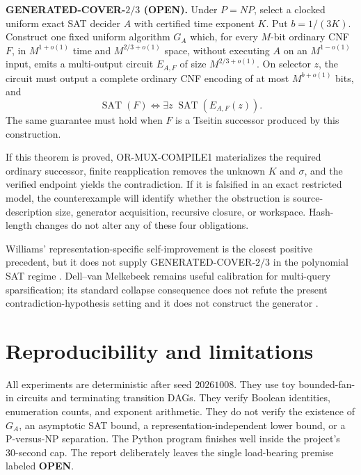 \documentclass[11pt]{article}
\newcommand{\SAT}{\operatorname{SAT}}
\newcommand{\OPEN}{\textcolor{openstatus}{\textbf{OPEN}}}
\begin{document}
\begin{openstatusbox}
\textbf{GENERATED-COVER-$2/3$ (OPEN).}
Under $P=NP$, select a clocked uniform exact SAT decider $A$ with certified
time exponent $K$.  Put $b=1/(3K)$.  Construct one fixed uniform algorithm
$G_A$ which, for every $M$-bit ordinary CNF $F$, in $M^{1+o(1)}$ time and
$M^{2/3+o(1)}$ space, without executing $A$ on an $M^{1-o(1)}$ input, emits a
multi-output circuit $E_{A,F}$ of size $M^{2/3+o(1)}$.  On selector $z$, the
circuit must output a complete ordinary CNF encoding of at most
$M^{b+o(1)}$ bits, and
\[
 \SAT(F)\iff\exists z\;\SAT(E_{A,F}(z)).
\]
The same guarantee must hold when $F$ is a Tseitin successor produced by this
construction.
\end{openstatusbox}

If this theorem is proved, OR-MUX-COMPILE1 materializes the required ordinary
successor, finite reapplication removes the unknown $K$ and $\sigma$, and the
verified endpoint yields the contradiction.  If it is falsified in an exact
restricted model, the counterexample will identify whether the obstruction is
source-description size, generator acquisition, recursive closure, or
workspace.  Hash-length changes do not alter any of these four obligations.

Williams' representation-specific self-improvement is the closest positive
precedent, but it does not supply GENERATED-COVER-$2/3$ in the polynomial SAT
regime \cite{williams2024}.  Dell--van Melkebeek remains useful calibration for
multi-query sparsification; its standard collapse consequence does not refute
the present contradiction-hypothesis setting and it does not construct the
generator \cite{dellvanmelkebeek2014}.

\section{Reproducibility and limitations}

All experiments are deterministic after seed $20261008$.  They use toy
bounded-fan-in circuits and terminating transition DAGs.  They verify Boolean
identities, enumeration counts, and exponent arithmetic.  They do not verify
the existence of $G_A$, an asymptotic SAT bound, a representation-independent
lower bound, or a P-versus-NP separation.  The Python program finishes well
inside the project's 30-second cap.  The report deliberately leaves the
single load-bearing premise labeled \OPEN.




\end{document}
